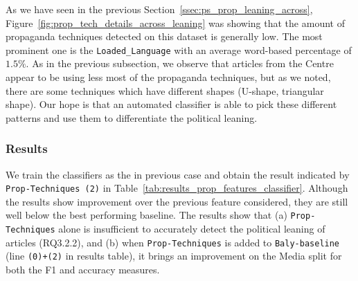 
As we have seen in the previous Section~\ref{ssec:ps_prop_leaning_across},  Figure~\ref{fig:prop_tech_details_across_leaning} was showing that the amount of propaganda techniques detected on this dataset is generally low. The most prominent one is the \texttt{Loaded\_Language} with an average word-based percentage of $1.5\%$.
As in the previous subsection, we observe that articles from the Centre appear to be using less most of the propaganda techniques, %
but as we noted, there are some techniques which have different shapes (U-shape, triangular shape). Our hope is that an automated classifier is able to pick these different patterns and use them to differentiate the political leaning.




\subsubsection{Results}

We train the classifiers as the in previous case and obtain the result indicated by \texttt{Prop-Techniques (2)} in Table~\ref{tab:results_prop_features_classifier}. Although the results show improvement over the previous feature considered, they are still well below the best performing baseline. %
The results show that (a) \texttt{Prop-Techniques} alone is insufficient to accurately detect the political leaning of articles (RQ3.2.2), and (b) when \texttt{Prop-Techniques} is added to \texttt{Baly-baseline} (line \texttt{(0)+(2)} in results table), it brings an improvement on the Media split for both the F1 and accuracy measures.


